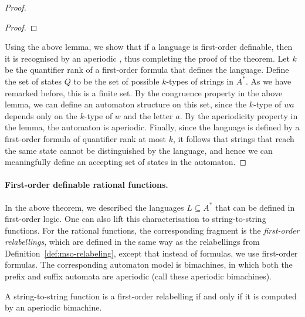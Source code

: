 \begin{proof}
\begin{proof}
    \end{proof}


Using the above lemma, we show that if a language is first-order definable, then it is recognised by an aperiodic \dfa, thus completing the proof of the theorem. Let $k$ be the quantifier rank of a first-order formula that defines the language. Define the set of states $Q$ to be the set of possible $k$-types of strings in $A^*$. As we have remarked before, this is a finite set. By the congruence property in the above lemma, we can define an automaton structure on this set, since the $k$-type of $wa$ depends only on the $k$-type of $w$ and the letter $a$. By the aperiodicity property in the lemma, the automaton  is aperiodic. Finally, since the language is defined by a first-order formula of quantifier rank at most $k$, it follows that strings that reach the same state cannot be distinguished by the language, and hence we can meaningfully define an accepting set of states in the automaton.
\end{proof}

\paragraph*{First-order definable rational functions.}
In the above theorem, we described the languages $L \subseteq A^*$ that can be defined in first-order logic. One can also lift this characterisation to string-to-string functions. For the rational functions, the corresponding fragment is the \emph{first-order relabellings}, which are defined in the same way as the \mso relabellings from Definition~\ref{def:mso-relabeling}, except that instead of \mso formulas, we use first-order formulas. The corresponding automaton model is bimachines, in which both the prefix and suffix automata are aperiodic (call these aperiodic bimachines). 

\begin{theorem}\label{thm:fo-rational-functions}
    A string-to-string function is a first-order relabelling if and only if it is computed by an aperiodic bimachine.
\end{theorem}

